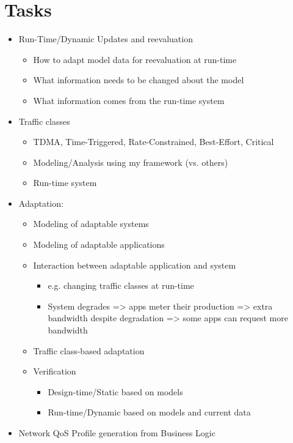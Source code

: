 \chapter{Tasks}
\label{ch:tasks}

\begin{itemize}
	\item Run-Time/Dynamic Updates and reevaluation
	\begin{itemize}
		\item How to adapt model data for reevaluation at run-time
		\item What information needs to be changed about the model
		\item What information comes from the run-time system
	\end{itemize}
	\item Traffic classes
	\begin{itemize}
		\item TDMA, Time-Triggered, Rate-Constrained, Best-Effort, Critical
		\item Modeling/Analysis using my framework (vs. others)
		\item Run-time system
	\end{itemize}
	\item Adaptation:
	\begin{itemize}
		\item Modeling of adaptable systems
		\item Modeling of adaptable applications
		\item Interaction between adaptable application and system
		\begin{itemize}
			\item e.g. changing traffic classes at run-time
			\item System degrades => apps meter their production => extra bandwidth despite degradation => some apps can request more bandwidth
		\end{itemize}
		\item Traffic class-based adaptation
		\item Verification
		\begin{itemize}
			\item Design-time/Static based on models
			\item Run-time/Dynamic based on models and current data
		\end{itemize}
	\end{itemize}
	\item Network QoS Profile generation from Business Logic

\end{itemize}

